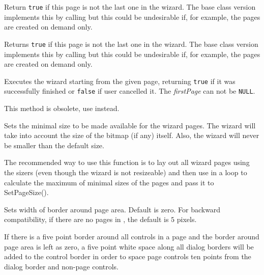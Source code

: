 \label{wxwizardhasnextpage}


Return {\tt true} if this page is not the last one in the wizard. The base
class version implements this by calling 
 but this could be undesirable if,
for example, the pages are created on demand only.




\label{wxwizardhasprevpage}


Returns {\tt true} if this page is not the last one in the wizard. The base
class version implements this by calling 
 but this could be undesirable if,
for example, the pages are created on demand only.




\label{wxwizardrunwizard}


Executes the wizard starting from the given page, returning {\tt true} if it was
successfully finished or {\tt false} if user cancelled it. The {\it firstPage} 
can not be {\tt NULL}.


\label{wxwizardsetpagesize}


This method is obsolete, use
 instead.

Sets the minimal size to be made available for the wizard pages. The wizard
will take into account the size of the bitmap (if any) itself. Also, the
wizard will never be smaller than the default size.

The recommended way to use this function is to lay out all wizard pages using
the sizers (even though the wizard is not resizeable) and then use 
 in a loop to calculate the maximum
of minimal sizes of the pages and pass it to SetPageSize().


\label{wxwizardsetborder}


Sets width of border around page area. Default is zero. For backward
compatibility, if there are no pages in
, the default is $5$ pixels.

If there is a five point border around all controls in a page and the border around
page area is left as zero, a five point white space along all dialog borders
will be added to the control border in order to space page controls ten points from the dialog
border and non-page controls.


